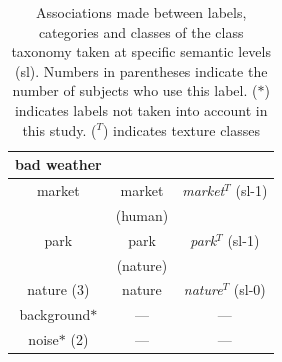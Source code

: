 \begin{table}[t]
\begin{tabular}{ccc}
bad weather           &                    &                                  \\ 
\hline
market                & market             &   \textit{market}$^T$ (sl-1)          \\ 
                      & (human)            &                                    \\
park                  & park               &   \textit{park}$^T$ (sl-1)           \\ 
                      & (nature)           &                                    \\
nature (3)            & nature             &   \textit{nature}$^T$ (sl-0)          \\  
background$*$         & ---                &    ---                              \\ 
noise$*$ (2)          & ---                &    ---                              \\               
\hline
\end{tabular}
\vspace{0.5mm}
\caption{\label{tab:association}  Associations made between labels, categories and classes of the class taxonomy taken at specific semantic levels (sl). Numbers in parentheses indicate the number of subjects who use this label. ($*$) indicates labels not taken into account in this study. ($^T$) indicates texture classes}
\end{table}


